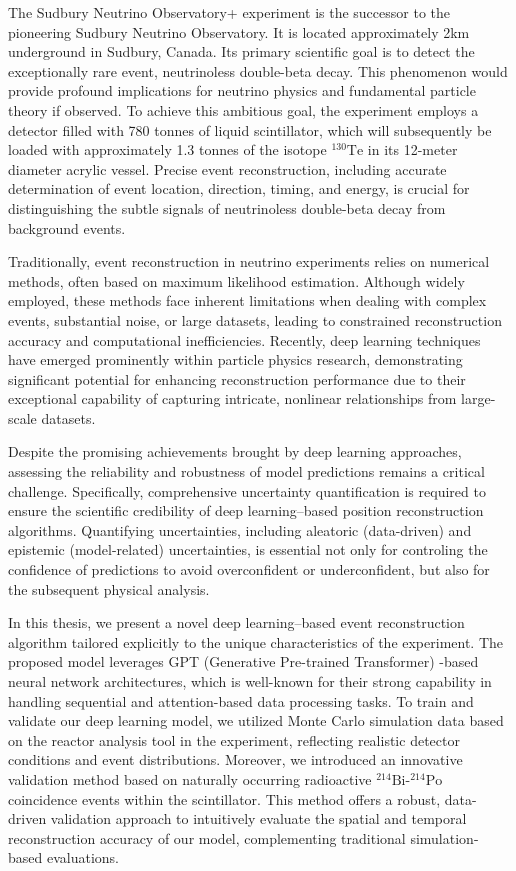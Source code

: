 \begin{enabstract}

The Sudbury Neutrino Observatory+ experiment is the successor to the pioneering Sudbury 
Neutrino Observatory. It is located approximately 2km 
underground in Sudbury, Canada. Its primary scientific goal is 
to detect the exceptionally rare event, neutrinoless double-beta 
decay. This phenomenon would provide profound 
implications for neutrino physics and fundamental particle theory 
if observed. To achieve this ambitious goal, the experiment employs a 
detector filled with 780 tonnes of liquid scintillator, which 
will subsequently be loaded with approximately 1.3 tonnes of 
the isotope $^{130}\mathrm{Te}$ in its 12-meter diameter acrylic 
vessel. Precise event reconstruction, including accurate 
determination of event location, direction, timing, and energy, 
is crucial for distinguishing the subtle signals of neutrinoless double-beta 
decay from background events.

Traditionally, event reconstruction in neutrino experiments 
relies on numerical methods, often based on maximum likelihood 
estimation. Although widely employed, these methods face 
inherent limitations when dealing with complex events, substantial 
noise, or large datasets, leading to constrained reconstruction 
accuracy and computational inefficiencies. Recently, 
deep learning techniques have emerged prominently 
within particle physics research, demonstrating significant 
potential for enhancing reconstruction performance due to 
their exceptional capability of capturing intricate, nonlinear 
relationships from large-scale datasets.

Despite the promising achievements brought by deep learning approaches, 
assessing the reliability and robustness of model predictions 
remains a critical challenge. Specifically, comprehensive 
uncertainty quantification is required to ensure the scientific 
credibility of deep learning–based position reconstruction algorithms. 
Quantifying uncertainties, including aleatoric (data-driven) and epistemic (model-related) uncertainties, 
is essential not only for controling the confidence of predictions to avoid overconfident or underconfident, 
but also for the subsequent physical analysis.

In this thesis, we present a novel deep learning–based event 
reconstruction algorithm tailored explicitly to the unique 
characteristics of the experiment. The proposed model 
leverages GPT (Generative Pre-trained Transformer) -based neural network architectures, 
which is well-known for their strong capability in handling 
sequential and attention-based data processing tasks. To 
train and validate our deep learning model, we utilized Monte Carlo 
simulation data based on the reactor analysis tool in the experiment, 
reflecting realistic detector conditions and event distributions. 
Moreover, we introduced an innovative validation method based on 
naturally occurring radioactive 
$^{214}\mathrm{Bi}$-$^{214}\mathrm{Po}$ coincidence events within 
the scintillator. This method offers a robust, data-driven 
validation approach to intuitively evaluate the spatial and 
temporal reconstruction accuracy of our model, complementing 
traditional simulation-based evaluations.


\end{enabstract}
